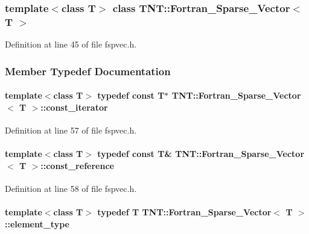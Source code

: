 \subsubsection*{template$<$class T$>$ class TNT::Fortran\_\-Sparse\_\-Vector$<$ T $>$}



Definition at line 45 of file fspvec.h.



\subsubsection{Member Typedef Documentation}
\paragraph[{const\_\-iterator}]{\setlength{\rightskip}{0pt plus 5cm}template$<$class T$>$ typedef const T$\ast$ {\bf TNT::Fortran\_\-Sparse\_\-Vector}$<$ T $>$::{\bf const\_\-iterator}}\hfill\label{class_t_n_t_1_1_fortran___sparse___vector_abc6533e965e4f1c9a0706ef9dde351a9}


Definition at line 57 of file fspvec.h.

\paragraph[{const\_\-reference}]{\setlength{\rightskip}{0pt plus 5cm}template$<$class T$>$ typedef const T\& {\bf TNT::Fortran\_\-Sparse\_\-Vector}$<$ T $>$::{\bf const\_\-reference}}\hfill\label{class_t_n_t_1_1_fortran___sparse___vector_aa734079fe78b7727c780491b0a1a8b3c}


Definition at line 58 of file fspvec.h.

\paragraph[{element\_\-type}]{\setlength{\rightskip}{0pt plus 5cm}template$<$class T$>$ typedef T {\bf TNT::Fortran\_\-Sparse\_\-Vector}$<$ T $>$::{\bf element\_\-type}}\hfill\label{class_t_n_t_1_1_fortran___sparse___vector_ac62daa559e30981515643d0b35ff9c16}


